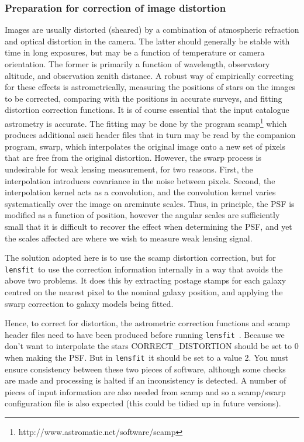 \documentclass{article}
\def\lensfit{{\tt lensfit}\ }
\begin{document}
\subsubsection{Preparation for correction of image distortion}\label{distortion}
Images are usually distorted (sheared) by a combination of atmospheric refraction and optical distortion 
in the camera. The latter should generally be stable with time in long exposures, 
but may be a function of temperature or 
camera orientation. The former is primarily a function of wavelength, observatory altitude, and observation 
zenith distance. A robust way of empirically correcting for these effects is astrometrically, measuring the 
positions of stars on the images to be corrected, comparing with the positions in accurate surveys, and fitting 
distortion correction functions. It is of course essential that the input catalogue astrometry is accurate. The 
fitting may be done by the program scamp\footnote{
http://www.astromatic.net/software/scamp}
which produces additional ascii header files that in turn may 
be read by the companion program, swarp, which interpolates the original image onto a new set of pixels 
that are free from the original distortion. However, the swarp 
process is undesirable for weak lensing 
measurement, for two reasons. First, the interpolation introduces covariance in the noise between pixels. 
Second, the interpolation kernel acts as a convolution, and the convolution kernel varies systematically over 
the image on arcminute scales. Thus, in principle, the PSF is modified as a function of position, however 
the angular scales are sufficiently small that it is difficult to recover the effect when determining the PSF, 
and yet the scales affected are where we wish to measure weak lensing signal. 

The solution adopted here is to use the scamp 
distortion correction, but for \lensfit to use the correction 
information internally in a way that avoids the above two problems. It does this by extracting postage 
stamps for each galaxy centred on the nearest pixel to the nominal galaxy position, and applying the swarp 
correction to galaxy models being fitted. 

Hence, to correct for distortion, the astrometric correction functions and scamp 
header files need to have 
been produced before running \lensfit. 
Because we don't want to interpolate the stars CORRECT\_DISTORTION should be set to 0 when making the
PSF.  But in \lensfit it should be set to a value 2.
You must ensure consistency between these two pieces of software, although some
checks are made and processing is halted if an inconsistency is detected.
A number of pieces of 
input information are also needed from scamp and so a scamp/swarp 
configuration file is also expected (this could be tidied up in future versions).
\end{document}
